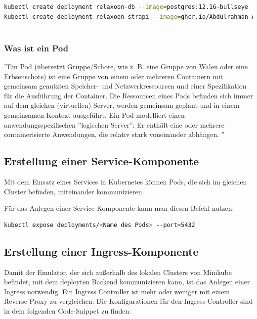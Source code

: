 \begin{lstlisting}[language=bash, caption=create k8s deployments]
kubectl create deployment relaxoon-db --image=postgres:12.16-bullseye --port=5432
kubectl create deployment relaxoon-strapi --image=ghcr.io/Abdulrahman-AL-Sabagh/relaxoon-strapi:latest --port=8080
    
\end{lstlisting}


\subsubsection{Was ist ein Pod}
''Ein Pod (übersetzt Gruppe/Schote, wie z. B. eine Gruppe von Walen oder eine Erbsenschote)
ist eine Gruppe von einem oder mehreren Containern mit gemeinsam genutzten Speicher- und
Netzwerkressourcen und einer Spezifikation für die Ausführung der Container.
Die Ressourcen eines Pods befinden sich immer auf dem gleichen (virtuellen) Server,
werden gemeinsam geplant und in einem gemeinsamen Kontext ausgeführt.
Ein Pod modelliert einen anwendungsspezifischen ''logischen Server'': Er enthält eine oder mehrere
containerisierte Anwendungen, die relativ stark voneinander abhängen.
''
\cite{pod}






\subsection{Erstellung einer Service-Komponente}

Mit dem Einsatz eines Services in Kubernetes können Pods,
die sich im gleichen Cluster befinden, miteinander kommunizieren. \cite{k8s-service}

Für das Anlegen einer Service-Komponente kann man diesen Befehl nutzen:

\begin{lstlisting}[language=bash,caption=create a service component]
kubectl expose deployments/<Name des Pods> --port=5432
\end{lstlisting}






\subsection{Erstellung einer Ingress-Komponente}

Damit der Emulator, der sich außerhalb des lokalen Clusters von Minikube befindet,
mit dem deployten Backend kommunizieren kann,
ist das Anlegen einer Ingress notwendig. Ein Ingress Controller ist mehr oder weniger mit einem Reverse Proxy zu vergleichen.
Die Konfigurationen für den Ingress-Controller sind in dem folgenden Code-Snippet zu finden:

